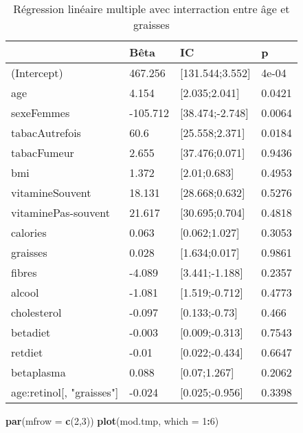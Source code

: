\documentclass[]{article}
\newenvironment{Shaded}{\begin{snugshade}}{\end{snugshade}}
\newcommand{\KeywordTok}[1]{\textcolor[rgb]{0.13,0.29,0.53}{\textbf{#1}}}
\newcommand{\DataTypeTok}[1]{\textcolor[rgb]{0.13,0.29,0.53}{#1}}
\newcommand{\DecValTok}[1]{\textcolor[rgb]{0.00,0.00,0.81}{#1}}
\newcommand{\OperatorTok}[1]{\textcolor[rgb]{0.81,0.36,0.00}{\textbf{#1}}}
\newcommand{\NormalTok}[1]{#1}
\begin{document}
\begin{table}

\caption{\label{tab:unnamed-chunk-53}Régression linéaire multiple avec interraction entre âge et graisses}
\centering
\begin{tabular}[t]{l|l|l|l}
\hline
  & Bêta & IC & p\\
\hline
\rowcolor[HTML]{BBD2E1}  (Intercept) & 467.256 & [131.544;3.552] & 4e-04\\
\hline
age & 4.154 & [2.035;2.041] & 0.0421\\
\hline
\rowcolor[HTML]{BBD2E1}  sexeFemmes & -105.712 & [38.474;-2.748] & 0.0064\\
\hline
tabacAutrefois & 60.6 & [25.558;2.371] & 0.0184\\
\hline
\rowcolor[HTML]{BBD2E1}  tabacFumeur & 2.655 & [37.476;0.071] & 0.9436\\
\hline
bmi & 1.372 & [2.01;0.683] & 0.4953\\
\hline
\rowcolor[HTML]{BBD2E1}  vitamineSouvent & 18.131 & [28.668;0.632] & 0.5276\\
\hline
vitaminePas-souvent & 21.617 & [30.695;0.704] & 0.4818\\
\hline
\rowcolor[HTML]{BBD2E1}  calories & 0.063 & [0.062;1.027] & 0.3053\\
\hline
graisses & 0.028 & [1.634;0.017] & 0.9861\\
\hline
\rowcolor[HTML]{BBD2E1}  fibres & -4.089 & [3.441;-1.188] & 0.2357\\
\hline
alcool & -1.081 & [1.519;-0.712] & 0.4773\\
\hline
\rowcolor[HTML]{BBD2E1}  cholesterol & -0.097 & [0.133;-0.73] & 0.466\\
\hline
betadiet & -0.003 & [0.009;-0.313] & 0.7543\\
\hline
\rowcolor[HTML]{BBD2E1}  retdiet & -0.01 & [0.022;-0.434] & 0.6647\\
\hline
betaplasma & 0.088 & [0.07;1.267] & 0.2062\\
\hline
\rowcolor[HTML]{BBD2E1}  age:retinol[, "graisses"] & -0.024 & [0.025;-0.956] & 0.3398\\
\hline
\end{tabular}
\end{table}

\begin{Shaded}
\begin{Highlighting}[]
\KeywordTok{par}\NormalTok{(}\DataTypeTok{mfrow =} \KeywordTok{c}\NormalTok{(}\DecValTok{2}\NormalTok{,}\DecValTok{3}\NormalTok{))}
\KeywordTok{plot}\NormalTok{(mod.tmp, }\DataTypeTok{which =} \DecValTok{1}\OperatorTok{:}\DecValTok{6}\NormalTok{)}
\end{Highlighting}
\end{Shaded}
\end{document}
